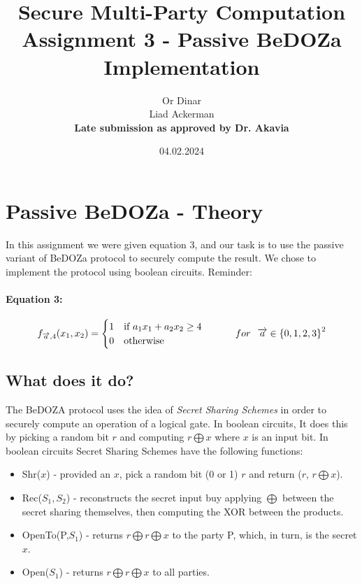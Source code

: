 \documentclass{article}
\title{\textbf{Secure Multi-Party Computation
}Assignment 3 - Passive BeDOZa Implementation\textbf{}}
\author{Or Dinar \\
Liad Ackerman\\
\textbf{Late submission as approved by Dr. Akavia}}
\date{04.02.2024} \newline
\begin{document}
\maketitle

\section{Passive BeDOZa - Theory}

In this assignment we were given equation 3, and our task is to use the passive variant of BeDOZa protocol to securely compute the result. 
\newline
We chose to implement the protocol using boolean circuits.
Reminder:
\paragraph{Equation 3:}

$$
f_{\overrightarrow{a},4}(x_{1},x_{2})=\begin{cases}
			1 & \text{if $a_1x_1 + a_2x_2 \geq 4$ }\\
            0 & \text{otherwise}
		 \end{cases} \hspace{1cm} for \hspace{.25cm}  \overrightarrow{a} \in {\left\{ 0,1,2,3\right\}}^{2}
$$



\subsection{What does it do?}
The BeDOZA protocol uses the idea of \textit{Secret Sharing Schemes} in order to securely compute an operation of a logical gate. In boolean circuits, It does this by picking a random bit $r$ and computing $r \bigoplus x$ where $x$ is an input bit. \newline
In boolean circuits Secret Sharing Schemes have the following functions:
\begin{itemize}
  \item Shr($x$) - provided an $x$, pick a random bit (0 or 1) $r$ and return ($r$, $r \bigoplus x$).
  \item Rec($S_1,S_2$) - reconstructs the secret input buy applying $\bigoplus$ between the secret sharing themselves, then computing the XOR between the products.
  \item OpenTo(P,$S_1$) - returns $r\bigoplus r \bigoplus x$ to the party P, which, in turn, is the secret $x$.
  \item Open($S_1$) - returns $r\bigoplus r \bigoplus x$ to all parties.
\end{itemize}
\newpage
\end{document}
